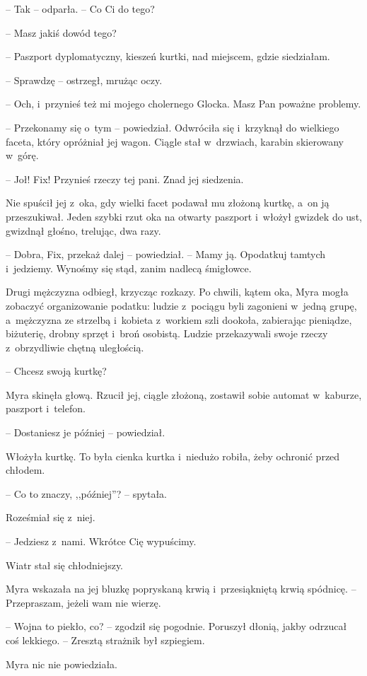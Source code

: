 \documentclass[oneside,polish,11pt,sfheadings]{mwbk}
\begin{document}
-- Tak -- odparła. -- Co Ci do tego?

-- Masz jakiś dowód tego?

-- Paszport dyplomatyczny, kieszeń kurtki, nad miejscem, gdzie
siedziałam.

-- Sprawdzę -- ostrzegł, mrużąc oczy.

-- Och, i~przynieś też mi mojego cholernego Glocka. Masz Pan poważne
problemy.

-- Przekonamy się o~tym -- powiedział. Odwróciła się i~krzyknął do
wielkiego faceta, który opróżniał jej wagon. Ciągle stał w~drzwiach,
karabin skierowany w~górę.

-- Joł! Fix! Przynieś rzeczy tej pani. Znad jej siedzenia.

Nie spuścił jej z~oka, gdy wielki facet podawał mu złożoną kurtkę, a~on
ją przeszukiwał. Jeden szybki rzut oka na otwarty paszport i~włożył
gwizdek do ust, gwizdnął głośno, trelując, dwa razy.

-- Dobra, Fix, przekaż dalej -- powiedział. -- Mamy ją. Opodatkuj tamtych i~jedziemy. Wynośmy się stąd, zanim nadlecą śmigłowce.

Drugi mężczyzna odbiegł, krzycząc rozkazy. Po chwili, kątem oka, Myra
mogła zobaczyć organizowanie podatku: ludzie z~pociągu byli zagonieni w~jedną grupę, a~mężczyzna ze strzelbą i~kobieta z~workiem szli dookoła,
zabierając pieniądze, biżuterię, drobny sprzęt i~broń osobistą. Ludzie
przekazywali swoje rzeczy z~obrzydliwie chętną uległością.

-- Chcesz swoją kurtkę?

Myra skinęła głową. Rzucił jej, ciągle złożoną, zostawił sobie automat w~kaburze, paszport i~telefon.

-- Dostaniesz je później -- powiedział.

Włożyła kurtkę. To była cienka kurtka i~niedużo robiła, żeby ochronić
przed chłodem.

-- Co to znaczy, ,,później''? -- spytała.

Roześmiał się z~niej.

-- Jedziesz z~nami. Wkrótce Cię wypuścimy.

Wiatr stał się chłodniejszy.

Myra wskazała na jej bluzkę popryskaną krwią i~przesiąkniętą krwią
spódnicę. -- Przepraszam, jeżeli wam nie wierzę.

-- Wojna to piekło, co? -- zgodził się pogodnie. Poruszył dłonią, jakby
odrzucał coś lekkiego. -- Zresztą strażnik był szpiegiem.

Myra nic nie powiedziała.
\end{document}
